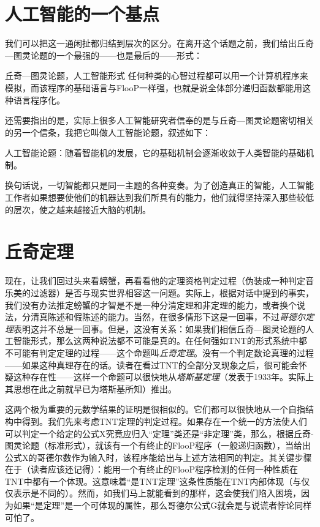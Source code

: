 \section{人工智能的一个基点}

我们可以把这一通闲扯都归结到层次的区分。在离开这个话题之前，我们给出丘奇—图灵论题的一个最强的——也是最后的——形式：

\begin{thm}[2\ccwd]{丘奇—图灵论题，人工智能形式}
任何种类的心智过程都可以用一个计算机程序来模拟，而该程序的基础语言与FlooP一样强，也就是说全体部分递归函数都能用这种语言程序化。
\end{thm}

还需要指出的是，实际上很多人工智能研究者信奉的是与丘奇—图灵论题密切相关的另一个信条，我把它叫做人工智能论题，叙述如下：

\begin{block}
人工智能论题：随着智能机的发展，它的基础机制会逐渐收敛于人类智能的基础机制。
\end{block}

换句话说，一切智能都只是同一主题的各种变奏。为了创造真正的智能，人工智能工作者如果想要使他们的机器达到我们所具有的能力，他们就得坚持深入那些较低的层次，使之越来越接近大脑的机制。

\section{丘奇定理}

现在，让我们回过头来看螃蟹，再看看他的定理资格判定过程（伪装成一种判定音乐美的过滤器）是否与现实世界相容这一问题。实际上，根据对话中提到的事实，我们没有办法推定螃蟹的才智是不是一种分清定理和非定理的能力，或者换个说法，分清真陈述和假陈述的能力。当然，在很多情形下这是一回事，不过\emph{哥德尔定理}表明这并不总是一回事。但是，这没有关系：如果我们相信丘奇—图灵论题的人工智能形式，那么这两种说法都不可能是真的。在任何强如TNT的形式系统中都不可能有判定定理的过程——这个命题叫\emph{丘奇定理}。没有一个判定数论真理的过程——如果这种真理存在的话。读者在看过TNT的全部分叉现象之后，很可能会怀疑这种存在性——这样一个命题可以很快地从\emph{塔斯基定理}（发表于1933年。实际上其思想在此之前就早已为塔斯基所知）推出。

这两个极为重要的元数学结果的证明是很相似的。它们都可以很快地从一个自指结构中得到。我们先来考虑TNT定理的判定过程。如果存在一个统一的方法使人们可以判定一个给定的公式X究竟应归入“定理”类还是“非定理”类，那么，根据丘奇-图灵论题（标准形式），就该有一个有终止的FlooP程序（一般递归函数），当给出公式X的哥德尔数作为输入时，该程序能给出与上述方法相同的判定。其关键步骤在于（读者应该还记得）：能用一个有终止的FlooP程序检测的任何一种性质在TNT中都有一个体现。这意味着“是TNT定理”这条性质能在TNT内部体现（与仅仅表示是不同的）。然而，如我们马上就能看到的那样，这会使我们陷入困境，因为如果“是定理”是一个可体现的属性，那么哥德尔公式G就会是与说谎者悖论同样可怕了。

